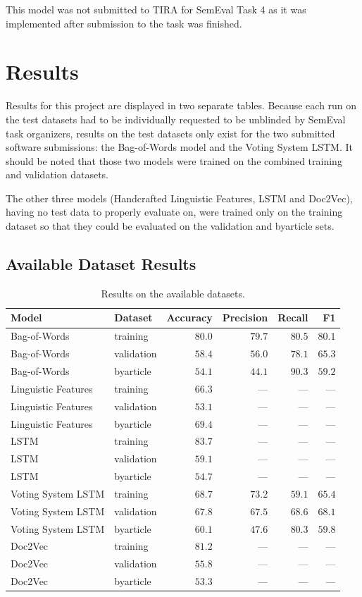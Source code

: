 \documentclass[11pt, a4paper]{article}
\begin{document}
This model was not submitted to TIRA for SemEval Task 4 as it was implemented after submission to the task was finished.

\section{Results}

Results for this project are displayed in two separate tables. Because each run on the test datasets had to be individually requested to be unblinded by SemEval task organizers, results on the test datasets only exist for the two submitted software submissions: the Bag-of-Words model and the Voting System LSTM. It should be noted that those two models were trained on the combined training and validation datasets. 

The other three models (Handcrafted Linguistic Features, LSTM and Doc2Vec), having no test data to properly evaluate on, were trained only on the training dataset so that they could be evaluated on the validation and byarticle sets.

\subsection{Available Dataset Results}

\begin{table}[t]
\centering
\begin{tabular}{|l||l||r|r|r|r|}
\hline \bf Model & \bf Dataset & \bf Accuracy & \bf Precision & \bf Recall & \bf F1 \\ \hline
Bag-of-Words & training & $80.0$ & $79.7$ & $80.5$ & $80.1$ \\
Bag-of-Words & validation & $58.4$ & $56.0$ & $78.1$ & $65.3$ \\
Bag-of-Words & byarticle & $54.1$ & $44.1$ & $90.3$ & $59.2$ \\
Linguistic Features & training & $66.3$ & --- & --- & --- \\
Linguistic Features & validation & $53.1$ & --- & --- & --- \\
Linguistic Features & byarticle & $69.4$ & --- & --- & --- \\
LSTM & training & $83.7$ & --- & --- & --- \\
LSTM & validation & $59.1$ & --- & --- & --- \\
LSTM & byarticle & $54.7$ & --- & --- & --- \\
Voting System LSTM & training & $68.7$ & $73.2$ & $59.1$ & $65.4$ \\
Voting System LSTM & validation & $67.8$ & $67.5$ & $68.6$ & $68.1$ \\
Voting System LSTM & byarticle & $60.1$ & $47.6$ & $80.3$ & $59.8$ \\
Doc2Vec & training & $81.2$ & --- & --- & --- \\
Doc2Vec & validation & $55.8$ & --- & --- & --- \\
Doc2Vec & byarticle & $53.3$ & --- & --- & --- \\
\hline
\end{tabular}
\caption{\label{available-results} Results on the available datasets. }
\end{table}
\end{document}
